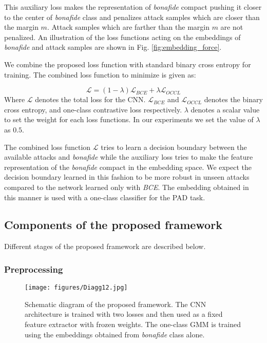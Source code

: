 \documentclass[journal]{IEEEtran}
\begin{document}
This auxiliary loss makes the representation of \textit{bonafide} compact pushing it closer to the center of \textit{bonafide} class and penalizes attack samples which are closer than the margin $m$. Attack samples which are farther than the margin $m$ are not penalized. An illustration of the loss functions acting on the embeddings of \textit{bonafide} and attack samples are shown in Fig. \ref{fig:embedding_force}.

We combine the proposed loss function with standard binary cross entropy for training. The combined loss function to minimize is given as:

\begin{equation}
\mathcal{L} = (1-\lambda)\mathcal{L}_{BCE} + \lambda \mathcal{L}_{OCCL}
\end{equation}
 Where $\mathcal{L}$ denotes the total loss for the CNN. $\mathcal{L}_{BCE}$ and $\mathcal{L}_{OCCL}$ denotes the binary cross entropy, and one-class contrastive loss  respectively.  $\lambda$ denotes a scalar value to set the weight for each loss functions. In our experiments we set the value of $\lambda$ as $0.5$.

The combined loss function $\mathcal{L}$ tries to learn a decision boundary between the available attacks and \textit{bonafide} while the auxiliary loss tries to make the feature representation of the \textit{bonafide} compact in the embedding space. We expect the decision boundary learned in this fashion to be more robust in unseen attacks compared to the network learned only with \textit{BCE}. The embedding obtained in this manner is used with a one-class classifier for the PAD task.
\subsection{ Components of the proposed framework}

Different stages of the proposed framework are described below.
\subsubsection{Preprocessing}

\begin{figure*}[t!]
     \centering
         \texttt{[image: figures/Diagg12.jpg]}

\caption{Schematic diagram of the proposed framework. The CNN architecture is trained with two losses and then used as a fixed feature extractor with frozen weights. The one-class GMM is trained using the embeddings obtained from \textit{bonafide} class alone. }
\label{fig:arch}
\end{figure*}
\end{document}
